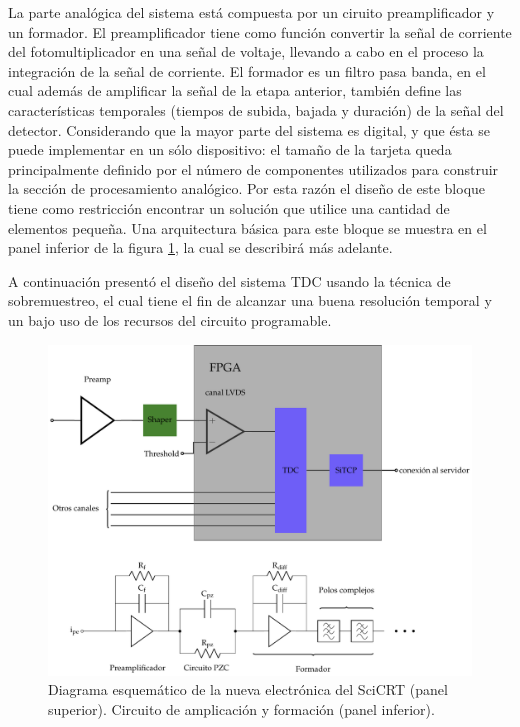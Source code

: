 La parte analógica del sistema está compuesta por un ciruito preamplificador y un formador. El preamplificador tiene como función convertir la señal de corriente del fotomultiplicador en una señal de voltaje, llevando a cabo en el proceso la integración de la señal de corriente. El formador es un filtro pasa banda, en el cual además de amplificar la señal de la etapa anterior, también define las características temporales (tiempos de subida, bajada y duración) de la señal del detector. Considerando que la mayor parte del sistema es digital, y que ésta se puede implementar en un sólo dispositivo: el tamaño de la tarjeta queda principalmente definido por el número de componentes utilizados para construir la sección de procesamiento analógico. Por esta razón el diseño de este bloque tiene como restricción encontrar un solución que utilice una cantidad de elementos pequeña. Una arquitectura básica para este bloque se muestra en el panel inferior de la figura \ref{fig:nfeb-prot}, la cual se describirá más adelante.

A continuación presentó el diseño del sistema TDC usando la técnica de sobremuestreo, el cual tiene el fin de alcanzar una buena resolución temporal y un bajo uso de los recursos del circuito programable.

\begin{figure}
        \centering
        \includegraphics[width=\textwidth]{nfeb-prot.pdf}
        \caption{Diagrama esquemático de la nueva electrónica del SciCRT (panel superior). Circuito de amplicación y formación (panel inferior).}
        \label{fig:nfeb-prot}
\end{figure}

